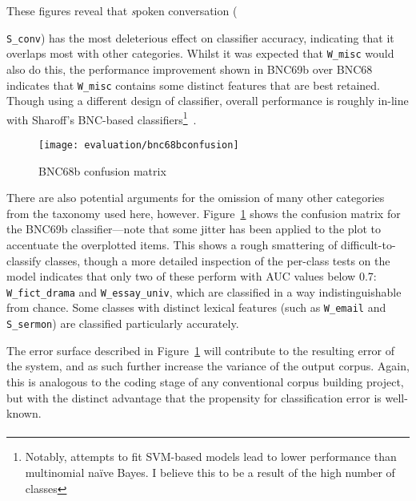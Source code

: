 These figures reveal that {\textsl spoken conversation} ({\texttt{S\_conv}) has the most deleterious effect on classifier accuracy, indicating that it overlaps most with other categories.  Whilst it was expected that \texttt{W\_misc} would also do this, the performance improvement shown in BNC69b over BNC68 indicates that \texttt{W\_misc} contains some distinct features that are best retained.  Though using a different design of classifier, overall performance is roughly in-line with Sharoff's BNC-based classifiers\footnote{Notably, attempts to fit SVM-based models lead to lower performance than multinomial na\"ive Bayes.  I believe this to be a result of the high number of classes}~\cite[ibid.]{sharoff2007classifying}.
    

\begin{figure}[Ht]
    \centering
    \texttt{[image: evaluation/bnc68bconfusion]}
    \caption{BNC68b confusion matrix}
    \label{fig:evaluation:heuristics:bnc68bconfusion}
\end{figure}



There are also potential arguments for the omission of many other categories from the taxonomy used here, however.  Figure~\ref{fig:evaluation:heuristics:bnc68bconfusion} shows the confusion matrix for the BNC69b classifier---note that some jitter has been applied to the plot to accentuate the overplotted items.  This shows a rough smattering of difficult-to-classify classes, though a more detailed inspection of the per-class tests on the model indicates that only two of these perform with AUC values below 0.7: \texttt{W\_fict\_drama} and \texttt{W\_essay\_univ}, which are classified in a way indistinguishable from chance.  Some classes with distinct lexical features (such as \texttt{W\_email} and \texttt{S\_sermon}) are classified particularly accurately.

The error surface described in Figure~\ref{fig:evaluation:heuristics:bnc68bconfusion} will contribute to the resulting error of the system, and as such further increase the variance of the output corpus.  Again, this is analogous to the coding stage of any conventional corpus building project, but with the distinct advantage that the propensity for classification error is well-known.


\paragraph{}

}
